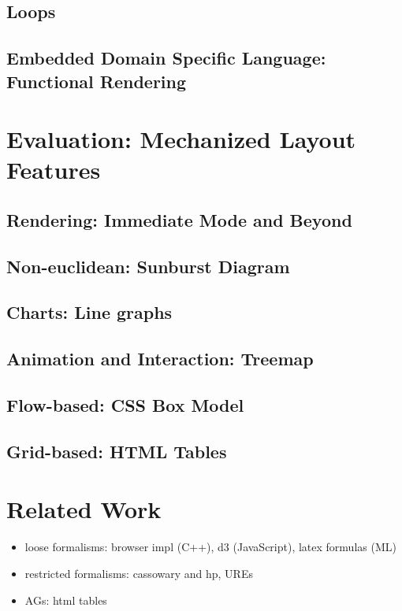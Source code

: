 \subsection{Loops}
\subsection{Embedded Domain Specific Language: Functional Rendering}



\section{Evaluation: Mechanized Layout Features}





\subsection{Rendering: Immediate Mode and Beyond}
\subsection{Non-euclidean: Sunburst Diagram}
\subsection{Charts: Line graphs}
\subsection{Animation and Interaction: Treemap}
\subsection{Flow-based: CSS Box Model}
\subsection{Grid-based: HTML Tables}

\section{Related Work}
\begin{itemize}
\item loose formalisms: browser impl (C++), d3 (JavaScript), latex formulas (ML)
\item restricted formalisms: cassowary and hp, UREs
\item AGs: html tables
\end{itemize}



